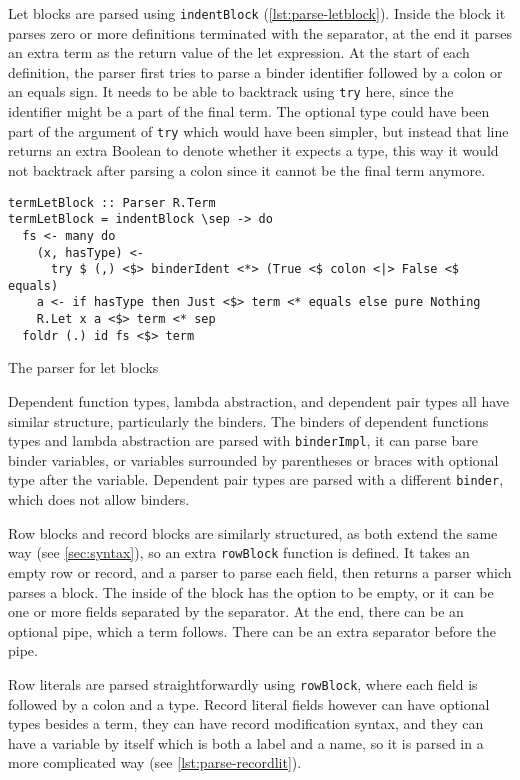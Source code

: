Let blocks are parsed using \texttt{indentBlock}
(\cref{lst:parse-letblock}). Inside the block it parses zero or more definitions
terminated with the separator, at the end it parses an extra term as the return
value of the let expression. At the start of each definition, the parser first
tries to parse a binder identifier followed by a colon or an equals sign. It
needs to be able to backtrack using \texttt{try} here, since the
identifier might be a part of the final term. The optional type could have been
part of the argument of \texttt{try} which would have been simpler, but
instead that line returns an extra Boolean to denote whether it expects a type,
this way it would not backtrack after parsing a colon since it cannot be the
final term anymore.

\begin{listing}
  \begin{verbatim}
termLetBlock :: Parser R.Term
termLetBlock = indentBlock \sep -> do
  fs <- many do
    (x, hasType) <-
      try $ (,) <$> binderIdent <*> (True <$ colon <|> False <$ equals)
    a <- if hasType then Just <$> term <* equals else pure Nothing
    R.Let x a <$> term <* sep
  foldr (.) id fs <$> term
  \end{verbatim}
  \caption{The parser for let blocks}\label{lst:parse-letblock}
\end{listing}

Dependent function types, lambda abstraction, and dependent pair types all have
similar structure, particularly the binders. The binders of dependent functions
types and lambda abstraction are parsed with \texttt{binderImpl}, it can
parse bare binder variables, or variables surrounded by parentheses or braces
with optional type after the variable. Dependent pair types are parsed with a
different \texttt{binder}, which does not allow binders.

Row blocks and record blocks are similarly structured, as both extend the same
way (see \cref{sec:syntax}), so an extra \texttt{rowBlock} function is
defined. It takes an empty row or record, and a parser to parse each field, then
returns a parser which parses a block. The inside of the block has the option to
be empty, or it can be one or more fields separated by the separator. At the
end, there can be an optional pipe, which a term follows. There can be an extra
separator before the pipe.

Row literals are parsed straightforwardly using \texttt{rowBlock}, where
each field is followed by a colon and a type. Record literal fields however can
have optional types besides a term, they can have record modification syntax,
and they can have a variable by itself which is both a label and a name, so it
is parsed in a more complicated way (see \cref{lst:parse-recordlit}).


